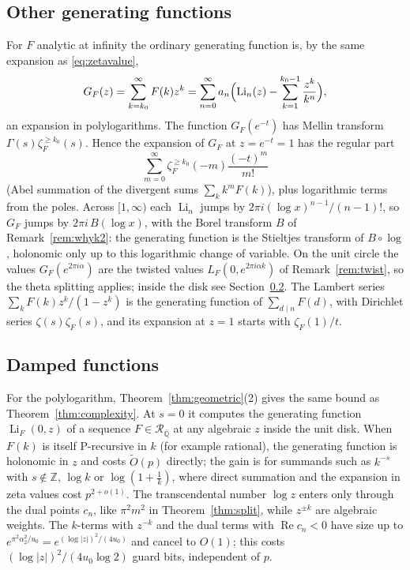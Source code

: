 \documentclass[11pt,reqno]{amsart}
\theoremstyle{definition}
\theoremstyle{remark}
\newcommand{\Li}{\operatorname{Li}}
\newcommand{\Qbar}{\overline{\mathbb{Q}}}
\newcommand{\RegQ}{\mathcal{R}_{\Qbar}}
\newcommand{\ZZ}{\mathbb{Z}}
\begin{document}
\subsection{Other generating functions}\label{sec:ogf}
For $F$ analytic at infinity the ordinary generating function is, by the same expansion as \eqref{eq:zetavalue},
\[
  G_F(z) = \sum_{k=k_0}^{\infty}F(k)z^k = \sum_{n=0}^{\infty}a_n\Bigl(\Li_n(z) - \sum_{k=1}^{k_0-1}\frac{z^k}{k^n}\Bigr),
\]
an expansion in polylogarithms. The function $G_F(e^{-t})$ has Mellin transform $\Gamma(s)\zeta_F^{\ge k_0}(s)$. Hence the
expansion of $G_F$ at $z = e^{-t} = 1$ has the regular part
\[
  \sum_{m=0}^{\infty}\zeta_F^{\ge k_0}(-m)\frac{(-t)^m}{m!}
\]
(Abel summation of the divergent sums $\sum_kk^mF(k)$), plus logarithmic terms from the poles. Across $[1,\infty)$ each $\Li_n$ jumps by
$2\pi i(\log x)^{n-1}/(n-1)!$, so $G_F$ jumps by $2\pi i\,B(\log x)$, with the Borel transform $B$ of
Remark~\ref{rem:whyk2}: the generating function is the Stieltjes transform of $B\circ\log$, holonomic only up to this
logarithmic change of variable. On the unit circle the values $G_F(e^{2\pi i\alpha})$ are the twisted values
$L_F(0,e^{2\pi i\alpha k})$ of Remark~\ref{rem:twist}, so the theta splitting applies; inside the disk see
Section~\ref{sec:dampedcost}. The
Lambert series $\sum_kF(k)z^k/(1-z^k)$ is the generating function of $\sum_{d\mid n}F(d)$, with Dirichlet series
$\zeta(s)\zeta_F(s)$, and its expansion at $z = 1$ starts with $\zeta_F(1)/t$.

\subsection{Damped functions}\label{sec:dampedcost}
For the polylogarithm, Theorem~\ref{thm:geometric}(2) gives the same bound as Theorem~\ref{thm:complexity}. At
$s = 0$ it computes the generating function $\Li_F(0,z)$ of a sequence $F \in \RegQ$ at any algebraic $z$ inside the unit
disk. When $F(k)$ is itself P-recursive in $k$ (for example rational), the generating function is holonomic in $z$ and
costs $\widetilde O(p)$ directly; the gain is for summands such as $k^{-s}$ with $s \notin \ZZ$, $\log k$ or
$\log(1+\frac1k)$, where direct summation and the expansion in zeta values cost $p^{2+o(1)}$. The transcendental number $\log z$ enters only through the dual points
$c_n$, like $\pi^2m^2$ in Theorem~\ref{thm:split}, while $z^{\pm k}$ are algebraic weights. The $k$-terms with $z^{-k}$
and the dual terms with $\operatorname{Re}c_n < 0$ have size up to $e^{\pi^2\alpha_2^2/u_0} = e^{(\log|z|)^2/(4u_0)}$
and cancel to $O(1)$; this costs $(\log|z|)^2/(4u_0\log2)$ guard bits, independent of $p$.
\end{document}
